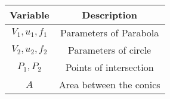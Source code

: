 \begin{tabular}[12pt]{ |c| c|}
    \hline
    \textbf{Variable} & \textbf{Description}\\ 
    \hline
    $V_1,u_1,f_1$ & Parameters of Parabola \\
    \hline 
    $V_2,u_2,f_2$ & Parameters of circle \\
    \hline
     $P_1,P_2$ & Points of intersection \\
     \hline
     $A$ & Area between the conics \\
    \hline
\end{tabular}
